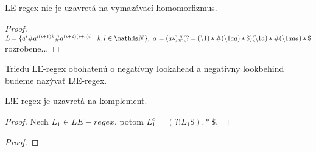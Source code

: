 \begin{veta}
LE-regex nie je uzavretá na vymazávací homomorfizmus.
\end{veta}
\begin{proof}
$ L = \lbrace a^i\#a^{i(i+1)k}\#a^{(i+2)(i+3)l} ~|~ k,l \in \N \rbrace, ~ \alpha = (a*)\#(?=(\backslash 1)*\#(\backslash 1 aa)*\mathdollar)(\backslash 1 a)*\#(\backslash 1 aaa)*\mathdollar $ \todo rozrobene...
\end{proof}


Triedu LE-regex obohatenú o negatívny lookahead a negatívny lookbehind budeme nazývať L!E-regex.

\begin{veta}
L!E-regex je uzavretá na komplement.
\end{veta}
\begin{proof}
Nech $L_1 \in LE-regex$, potom $L_1^c  = \left( ?! L_1 \mathdollar \right) .* \mathdollar $.
\end{proof}

\begin{veta}
\end{veta}
\begin{proof}
\end{proof}


